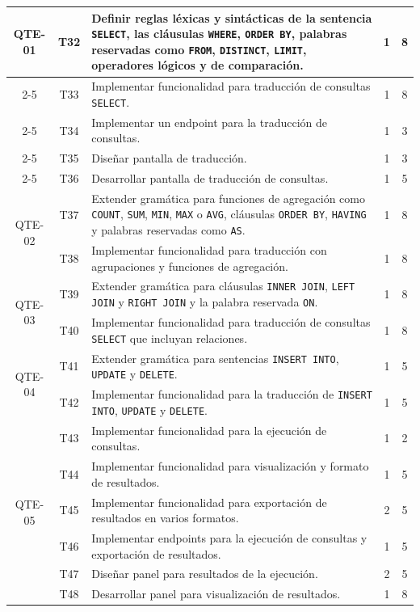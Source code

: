 \begin{longtable}[c]{|c|c|m{}|c|c|}
    \multirow{5}{*}{QTE-01} & T32 & Definir reglas léxicas y sintácticas de la sentencia \texttt{SELECT}, las cláusulas \texttt{WHERE}, \texttt{ORDER BY}, palabras reservadas como \texttt{FROM}, \texttt{DISTINCT}, \texttt{LIMIT}, operadores lógicos y de comparación. & 1 & 8 \\
    \cline{2-5}
     & T33 & Implementar funcionalidad para traducción de consultas \texttt{SELECT}. & 1 & 8 \\
    \cline{2-5}
     & T34 & Implementar un endpoint para la traducción de consultas. & 1 & 3 \\
    \cline{2-5}
     & T35 & Diseñar pantalla de traducción. & 1 & 3 \\
    \cline{2-5}
     & T36 & Desarrollar pantalla de traducción de consultas. & 1 & 5 \\
    \hline
    
    \multirow{2}{*}{QTE-02} & T37 & Extender gramática para funciones de agregación como \texttt{COUNT}, \texttt{SUM}, \texttt{MIN}, \texttt{MAX} o \texttt{AVG}, cláusulas \texttt{ORDER BY}, \texttt{HAVING} y palabras reservadas como \texttt{AS}. & 1 & 8 \\
    \cline{2-5}
     & T38 & Implementar funcionalidad para traducción con agrupaciones y funciones de agregación. & 1 & 8 \\
    \hline
    
    \multirow{2}{*}{QTE-03} & T39 & Extender gramática para cláusulas \texttt{INNER JOIN}, \texttt{LEFT JOIN} y \texttt{RIGHT JOIN} y la palabra reservada \texttt{ON}. & 1 & 8 \\
    \cline{2-5}
     & T40 & Implementar funcionalidad para traducción de consultas \texttt{SELECT} que incluyan relaciones. & 1 & 8 \\
    \hline
    
    \multirow{2}{*}{QTE-04} & T41 & Extender gramática para sentencias \texttt{INSERT INTO}, \texttt{UPDATE} y \texttt{DELETE}. & 1 & 5 \\
    \cline{2-5}
     & T42 & Implementar funcionalidad para la traducción de \texttt{INSERT INTO}, \texttt{UPDATE} y \texttt{DELETE}. & 1 & 5 \\
    \hline
    
    \multirow{6}{*}{QTE-05} & T43 & Implementar funcionalidad para la ejecución de consultas. & 1 & 2 \\
    \cline{2-5}
     & T44 & Implementar funcionalidad para visualización y formato de resultados. & 1 & 5 \\
    \cline{2-5}
     & T45 & Implementar funcionalidad para exportación de resultados en varios formatos. & 2 & 5 \\
    \cline{2-5}
     & T46 & Implementar endpoints para la ejecución de consultas y exportación de resultados. & 1 & 5 \\
    \cline{2-5}
     & T47 & Diseñar panel para resultados de la ejecución. & 2 & 5 \\
    \cline{2-5}
     & T48 & Desarrollar panel para visualización de resultados. & 1 & 8 \\
    \hline


\end{longtable}
